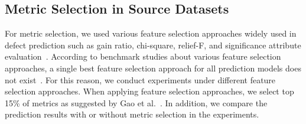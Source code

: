 % 

\subsection{Metric Selection in Source Datasets}\label{sect:fss}
\label{sec:metricselection}
For metric selection, we used various feature selection
approaches widely used in defect prediction such as gain ratio, chi-square,
relief-F, and significance attribute evaluation~\cite{Gao11,Shivaji13}.
According to benchmark studies about various feature selection approaches, a
single best feature selection approach for all prediction models does not
exist~\cite{Catal09,Hall03,Liu02}. For this reason, we conduct experiments
under different feature selection approaches. When applying feature selection
approaches, we select top 15\% of metrics as suggested by Gao et
al.~\cite{Gao11}. In addition, we compare the prediction results with or without
metric selection in the experiments.





